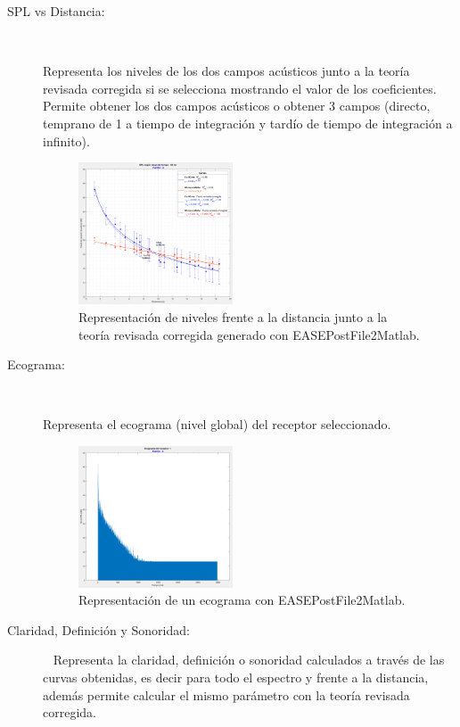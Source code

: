 \begin{description}
	\item[SPL vs Distancia:]~
	
	Representa los niveles de los dos campos acústicos junto a la teoría revisada corregida si se selecciona mostrando el valor de los coeficientes. Permite obtener los dos campos acústicos o obtener 3 campos (directo, temprano de 1 a tiempo de integración y tardío de tiempo de integración a infinito).
	\begin{figure}[ht]
    \centering
    \includegraphics[width=0.45\textwidth]{archivos/capturas/easespldist}
    \caption{Representación de niveles frente a la distancia junto a la teoría revisada corregida generado con EASEPostFile2Matlab.}
\end{figure}
\FloatBarrier

	\item[Ecograma:]~
	
	Representa el ecograma (nivel global) del receptor seleccionado.
	\begin{figure}[ht]
    \centering
    \includegraphics[width=0.45\textwidth]{archivos/capturas/ecograma}
    \caption{Representación de un ecograma con EASEPostFile2Matlab.}
\end{figure}
\FloatBarrier
	
	\item[Claridad, Definición y Sonoridad:]~
	Representa la claridad, definición o sonoridad calculados a través de las curvas obtenidas, es decir para todo el espectro y frente a la distancia, además permite calcular el mismo parámetro con la teoría revisada corregida.
	

\end{description}
